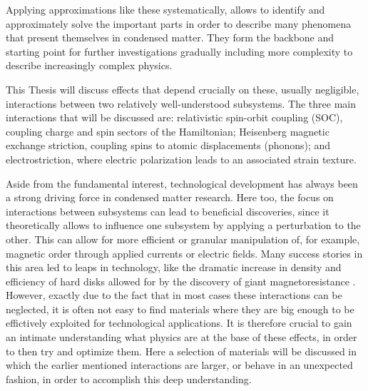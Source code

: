 Applying approximations like these systematically, allows to identify and approximately solve the important parts in order to describe many phenomena that present themselves in condensed matter.
They form the backbone and starting point for further investigations gradually including more complexity to describe increasingly complex physics.

This Thesis will discuss effects that depend crucially on these, usually negligible, interactions between two relatively well-understood subsystems.
The three main interactions that will be discussed are: relativistic spin-orbit coupling (SOC), coupling charge and spin sectors of the Hamiltonian; Heisenberg magnetic exchange striction, coupling spins to atomic displacements (phonons); and electrostriction, where electric polarization leads to an associated strain texture.

Aside from the fundamental interest, technological development has always been a strong driving force in condensed matter research. Here too, the focus on interactions between subsystems can lead to beneficial discoveries, since it theoretically allows to influence one subsystem by applying a perturbation to the other.
This can allow for more efficient or granular manipulation of, for example, magnetic order through applied currents or electric fields.
Many success stories in this area led to leaps in technology, like the dramatic increase in density and efficiency of hard disks allowed for by the discovery of giant magnetoresistance .
However, exactly due to the fact that in most cases these interactions can be neglected, it is often not easy to find materials where they are big enough to be effictively exploited for technological applications.
It is therefore crucial to gain an intimate understanding what physics are at the base of these effects, in order to then try and optimize them.
Here a selection of materials will be discussed in which the earlier mentioned interactions are larger, or behave in an unexpected fashion, in order to accomplish this deep understanding.

